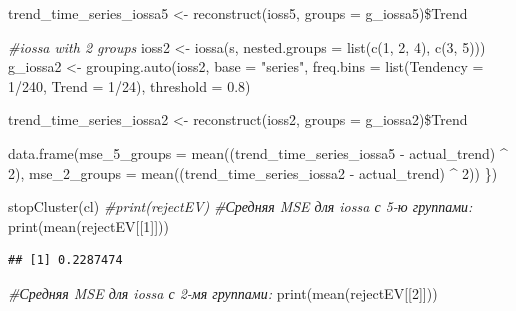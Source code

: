 \documentclass[specialist,
               substylefile = spbu_report.rtx,
               subf,href,colorlinks=true, 12pt]{disser}
\theoremstyle{definition}
\newenvironment{Shaded}{\begin{snugshade}}{\end{snugshade}}
\newcommand{\AttributeTok}[1]{\textcolor[rgb]{0.77,0.63,0.00}{#1}}
\newcommand{\CommentTok}[1]{\textcolor[rgb]{0.56,0.35,0.01}{\textit{#1}}}
\newcommand{\DecValTok}[1]{\textcolor[rgb]{0.00,0.00,0.81}{#1}}
\newcommand{\FloatTok}[1]{\textcolor[rgb]{0.00,0.00,0.81}{#1}}
\newcommand{\FunctionTok}[1]{\textcolor[rgb]{0.00,0.00,0.00}{#1}}
\newcommand{\NormalTok}[1]{#1}
\newcommand{\OtherTok}[1]{\textcolor[rgb]{0.56,0.35,0.01}{#1}}
\newcommand{\SpecialCharTok}[1]{\textcolor[rgb]{0.00,0.00,0.00}{#1}}
\newcommand{\StringTok}[1]{\textcolor[rgb]{0.31,0.60,0.02}{#1}}
\begin{document}
\begin{Shaded}
\begin{Highlighting}[]
\NormalTok{    trend\_time\_series\_iossa5 }\OtherTok{\textless{}{-}} \FunctionTok{reconstruct}\NormalTok{(ioss5, }\AttributeTok{groups =}\NormalTok{ g\_iossa5)}\SpecialCharTok{\$}\NormalTok{Trend}
    
    \CommentTok{\#iossa with 2 groups}
\NormalTok{    ioss2 }\OtherTok{\textless{}{-}} \FunctionTok{iossa}\NormalTok{(s, }\AttributeTok{nested.groups =} \FunctionTok{list}\NormalTok{(}\FunctionTok{c}\NormalTok{(}\DecValTok{1}\NormalTok{, }\DecValTok{2}\NormalTok{, }\DecValTok{4}\NormalTok{), }\FunctionTok{c}\NormalTok{(}\DecValTok{3}\NormalTok{, }\DecValTok{5}\NormalTok{)))}
\NormalTok{    g\_iossa2 }\OtherTok{\textless{}{-}} \FunctionTok{grouping.auto}\NormalTok{(ioss2, }\AttributeTok{base =} \StringTok{"series"}\NormalTok{, }
                   \AttributeTok{freq.bins =} \FunctionTok{list}\NormalTok{(}\AttributeTok{Tendency =} \DecValTok{1}\SpecialCharTok{/}\DecValTok{240}\NormalTok{, }\AttributeTok{Trend =} \DecValTok{1}\SpecialCharTok{/}\DecValTok{24}\NormalTok{), }
                   \AttributeTok{threshold =} \FloatTok{0.8}\NormalTok{)}
                   
\NormalTok{    trend\_time\_series\_iossa2 }\OtherTok{\textless{}{-}} \FunctionTok{reconstruct}\NormalTok{(ioss2, }\AttributeTok{groups =}\NormalTok{ g\_iossa2)}\SpecialCharTok{\$}\NormalTok{Trend}
    
    \FunctionTok{data.frame}\NormalTok{(}\AttributeTok{mse\_5\_groups =} \FunctionTok{mean}\NormalTok{((trend\_time\_series\_iossa5 }\SpecialCharTok{{-}}\NormalTok{ actual\_trend) }\SpecialCharTok{\^{}} \DecValTok{2}\NormalTok{), }
               \AttributeTok{mse\_2\_groups =} \FunctionTok{mean}\NormalTok{((trend\_time\_series\_iossa2 }\SpecialCharTok{{-}}\NormalTok{ actual\_trend) }\SpecialCharTok{\^{}} \DecValTok{2}\NormalTok{))}
\NormalTok{  \})}
  
  \FunctionTok{stopCluster}\NormalTok{(cl)}
  \CommentTok{\#print(rejectEV)}
  \CommentTok{\#Средняя MSE для iossa с 5{-}ю группами:}
  \FunctionTok{print}\NormalTok{(}\FunctionTok{mean}\NormalTok{(rejectEV[[}\DecValTok{1}\NormalTok{]]))}
\end{Highlighting}
\end{Shaded}

\begin{verbatim}
## [1] 0.2287474
\end{verbatim}

\begin{Shaded}
\begin{Highlighting}[]
  \CommentTok{\#Средняя MSE для iossa с 2{-}мя группами:}
  \FunctionTok{print}\NormalTok{(}\FunctionTok{mean}\NormalTok{(rejectEV[[}\DecValTok{2}\NormalTok{]]))}
\end{Highlighting}
\end{Shaded}
\end{document}
